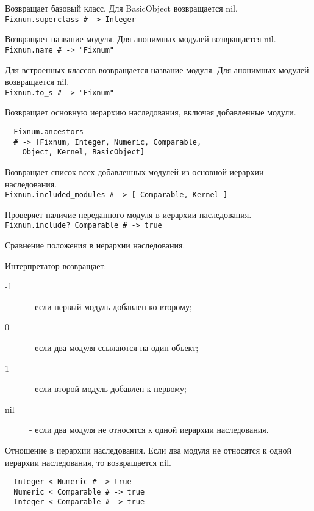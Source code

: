 \begin{methodlist}
  Возвращает базовый класс. Для BasicObject возвращается nil. 
  \\\verb!Fixnum.superclass # -> Integer!

  Возвращает название модуля. Для анонимных модулей возвращается nil. 
  \\\verb!Fixnum.name # -> "Fixnum"!
 
  Для встроенных классов возвращается название модуля. Для анонимных модулей возвращается nil. 
  \\\verb!Fixnum.to_s # -> "Fixnum"!
 
  Возвращает основную иерархию наследования, включая добавленные модули.
  \begin{verbatim}
  Fixnum.ancestors 
  # -> [Fixnum, Integer, Numeric, Comparable,
    Object, Kernel, BasicObject]
  \end{verbatim}
 
  Возвращает список всех добавленных модулей из основной иерархии наследования.
  \\\verb!Fixnum.included_modules # -> [ Comparable, Kernel ]!  

  Проверяет наличие переданного модуля в иерархии наследования. 
  \\\verb!Fixnum.include? Comparable # -> true!
 
  Сравнение положения в иерархии наследования.
  
  Интерпретатор возвращает:
  \begin{description}
    \item[-1] - если первый модуль добавлен ко второму; 
    \item[0] - если два модуля ссылаются на один объект; 
    \item[1] - если второй модуль добавлен к первому; 
    \item[nil] - если два модуля не относятся к одной иерархии наследования.
  \end{description} 

  Отношение в иерархии наследования. Если два модуля не относятся к одной иерархии наследования, то возвращается nil.
  \begin{verbatim}
  Integer < Numeric # -> true
  Numeric < Comparable # -> true
  Integer < Comparable # -> true
  \end{verbatim}


\end{methodlist}
